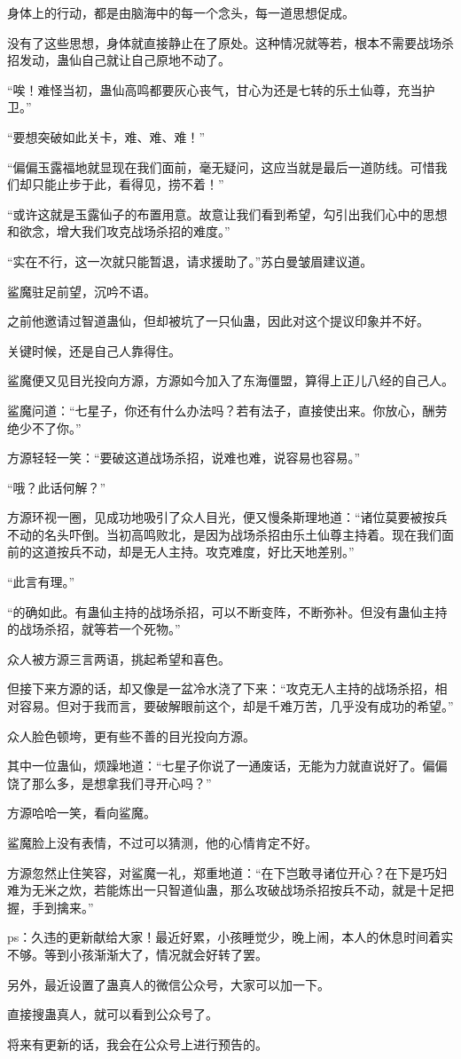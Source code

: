 \begin{this_body}
身体上的行动，都是由脑海中的每一个念头，每一道思想促成。

没有了这些思想，身体就直接静止在了原处。这种情况就等若，根本不需要战场杀招发动，蛊仙自己就让自己原地不动了。

“唉！难怪当初，蛊仙高鸣都要灰心丧气，甘心为还是七转的乐土仙尊，充当护卫。”

“要想突破如此关卡，难、难、难！”

“偏偏玉露福地就显现在我们面前，毫无疑问，这应当就是最后一道防线。可惜我们却只能止步于此，看得见，捞不着！”

“或许这就是玉露仙子的布置用意。故意让我们看到希望，勾引出我们心中的思想和欲念，增大我们攻克战场杀招的难度。”

“实在不行，这一次就只能暂退，请求援助了。”苏白曼皱眉建议道。

鲨魔驻足前望，沉吟不语。

之前他邀请过智道蛊仙，但却被坑了一只仙蛊，因此对这个提议印象并不好。

关键时候，还是自己人靠得住。

鲨魔便又见目光投向方源，方源如今加入了东海僵盟，算得上正儿八经的自己人。

鲨魔问道：“七星子，你还有什么办法吗？若有法子，直接使出来。你放心，酬劳绝少不了你。”

方源轻轻一笑：“要破这道战场杀招，说难也难，说容易也容易。”

“哦？此话何解？”

方源环视一圈，见成功地吸引了众人目光，便又慢条斯理地道：“诸位莫要被按兵不动的名头吓倒。当初高鸣败北，是因为战场杀招由乐土仙尊主持着。现在我们面前的这道按兵不动，却是无人主持。攻克难度，好比天地差别。”

“此言有理。”

“的确如此。有蛊仙主持的战场杀招，可以不断变阵，不断弥补。但没有蛊仙主持的战场杀招，就等若一个死物。”

众人被方源三言两语，挑起希望和喜色。

但接下来方源的话，却又像是一盆冷水浇了下来：“攻克无人主持的战场杀招，相对容易。但对于我而言，要破解眼前这个，却是千难万苦，几乎没有成功的希望。”

众人脸色顿垮，更有些不善的目光投向方源。

其中一位蛊仙，烦躁地道：“七星子你说了一通废话，无能为力就直说好了。偏偏饶了那么多，是想拿我们寻开心吗？”

方源哈哈一笑，看向鲨魔。

鲨魔脸上没有表情，不过可以猜测，他的心情肯定不好。

方源忽然止住笑容，对鲨魔一礼，郑重地道：“在下岂敢寻诸位开心？在下是巧妇难为无米之炊，若能炼出一只智道仙蛊，那么攻破战场杀招按兵不动，就是十足把握，手到擒来。”

ps：久违的更新献给大家！最近好累，小孩睡觉少，晚上闹，本人的休息时间着实不够。等到小孩渐渐大了，情况就会好转了罢。

另外，最近设置了蛊真人的微信公众号，大家可以加一下。

直接搜蛊真人，就可以看到公众号了。

将来有更新的话，我会在公众号上进行预告的。

\end{this_body}

